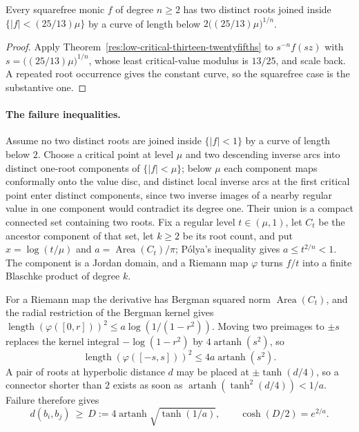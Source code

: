 \documentclass[11pt]{article}
\begin{document}
\begin{corollary}
\label{res:low-critical-scale-free}
Every squarefree monic $f$ of degree $n\ge2$ has two distinct roots joined
inside $\{|f|<(25/13)\mu\}$ by a curve of length below
$2\bigl((25/13)\mu\bigr)^{1/n}$.
\end{corollary}

\begin{proof}
Apply Theorem~\ref{res:low-critical-thirteen-twentyfifths} to
$s^{-n}f(sz)$ with $s=\bigl((25/13)\mu\bigr)^{1/n}$, whose least
critical-value modulus is $13/25$, and scale back.  A repeated root occurrence
gives the constant curve, so the squarefree case is the substantive one.
\end{proof}

\paragraph{The failure inequalities.}
Assume no two distinct roots are joined inside $\{|f|<1\}$ by a curve of
length below $2$.  Choose a critical point at level $\mu$ and two descending
inverse arcs into distinct one-root components of $\{|f|<\mu\}$; below $\mu$
each component maps conformally onto the value disc, and distinct local
inverse arcs at the first critical point enter distinct components, since two
inverse images of a nearby regular value in one component would contradict its
degree one.  Their union is a compact connected set containing two roots.
Fix a regular level $t\in(\mu,1)$, let $C_t$ be the ancestor component of that
set, let $k\ge2$ be its root count, and put $x=\log(t/\mu)$ and
$a=\operatorname{Area}(C_t)/\pi$; P\'olya's inequality gives $a\le t^{2/n}<1$.
The component is a Jordan domain, and a Riemann map $\varphi$ turns $f/t$ into
a finite Blaschke product of degree $k$.

For a Riemann map the derivative has Bergman squared norm
$\operatorname{Area}(C_t)$, and the radial restriction of the Bergman kernel
gives $\operatorname{length}(\varphi([0,r]))^2\le a\log(1/(1-r^2))$.  Moving
two preimages to $\pm s$ replaces the kernel integral $-\log(1-r^2)$ by
$4\operatorname{artanh}(s^2)$, so
\[
 \operatorname{length}(\varphi([-s,s]))^2\le4a\operatorname{artanh}(s^2).
\]
A pair of roots at hyperbolic distance $d$ may be placed at $\pm\tanh(d/4)$,
so a connector shorter than $2$ exists as soon as
$\operatorname{artanh}(\tanh^2(d/4))<1/a$.  Failure therefore gives
\begin{equation}\label{eq:lc-separation}
 d(b_i,b_j)\ \ge\ D:=4\operatorname{artanh}\sqrt{\tanh(1/a)},
 \qquad \cosh(D/2)=e^{2/a}.
\end{equation}
\end{document}
